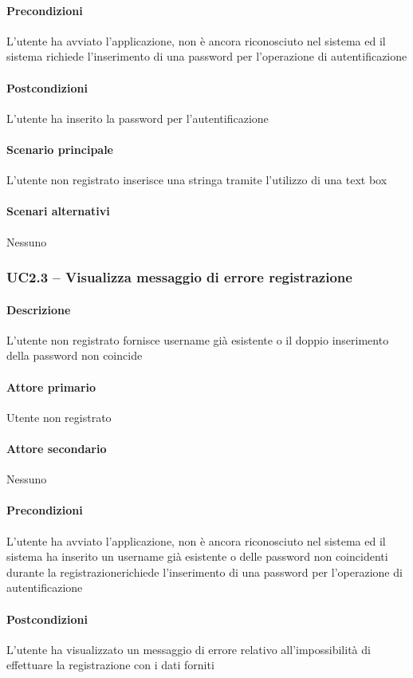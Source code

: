 \paragraph{Precondizioni}  L’utente ha avviato l’applicazione, non è ancora riconosciuto nel sistema ed il sistema richiede l’inserimento di una password per l’operazione di autentificazione
\paragraph{Postcondizioni}  L’utente ha inserito la password per l’autentificazione
\paragraph{Scenario principale}  
L’utente non registrato inserisce una stringa tramite l’utilizzo di una text box
\paragraph{Scenari alternativi}  Nessuno



\subsubsection{UC2.3 – Visualizza messaggio di errore registrazione}
\paragraph{Descrizione}  L’utente non registrato fornisce username già esistente o il doppio inserimento della password non coincide
\paragraph{Attore primario}  Utente non registrato
\paragraph{Attore secondario}  Nessuno
\paragraph{Precondizioni}  L’utente ha avviato l’applicazione, non è ancora riconosciuto nel sistema ed il sistema ha inserito un username già esistente o delle password non coincidenti durante la registrazionerichiede l’inserimento di una password per l’operazione di autentificazione
\paragraph{Postcondizioni}  L’utente ha visualizzato un messaggio di errore relativo all’impossibilità di effettuare la registrazione con i dati forniti
